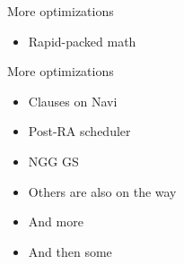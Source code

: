 \documentclass[aspectratio=169,t,xcolor=table]{beamer}
\begin{document}
\begin{frame}{More optimizations}
    \LARGE
    \begin{itemize}
        \item Rapid-packed math
    \end{itemize}
\end{frame}

\begin{frame}{More optimizations}
    \LARGE
    \begin{itemize}
        \item Clauses on Navi
        \item Post-RA scheduler
        \item NGG GS
        \item Others are also on the way
        \item And more
        \item And then some
    \end{itemize}
\end{frame}
\end{document}
